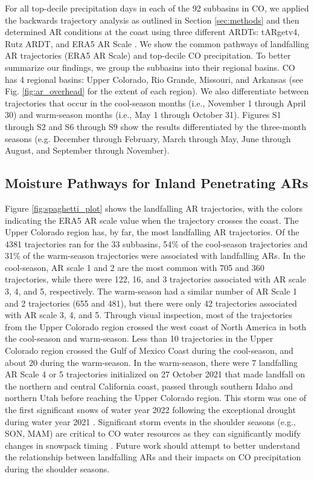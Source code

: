 \documentclass[draft]{agujournal2019}
\begin{document}
For all top-decile precipitation days in each of the 92 subbasins in CO, we applied the backwards trajectory analysis as outlined in Section \ref{sec:methods} and then determined AR conditions at the coast using three different ARDTs: tARgetv4, Rutz ARDT, and ERA5 AR Scale \cite{MartinRalph2019, Rutz2014, Guan2024AERA5}. We show the common pathways of landfalling AR trajectories (ERA5 AR Scale) and top-decile CO precipitation. To better summarize our findings, we group the subbasins into their regional basins. CO has 4 regional basins: Upper Colorado, Rio Grande, Missouri, and Arkansas (see Fig. \ref{fig:ar_overhead} for the extent of each region). We also differentiate between trajectories that occur in the cool-season months (i.e., November 1 through April 30) and warm-season months (i.e., May 1 through October 31). Figures S1 through S2 and S6 through S9 show the results differentiated by the three-month seasons (e.g. December through February, March through May, June through August, and September through November).

\subsection{Moisture Pathways for Inland Penetrating ARs}
\label{sec:results:moisture_pathways}

Figure \ref{fig:spaghetti_plot} shows the landfalling AR trajectories, with the colors indicating the ERA5 AR scale value when the trajectory crosses the coast. The Upper Colorado region has, by far, the most landfalling AR trajectories. Of the 4381 trajectories ran for the 33 subbasins, 54\% of the cool-season trajectories and 31\% of the warm-season trajectories were associated with landfalling ARs. In the cool-season, AR scale 1 and 2 are the most common with 705 and 360 trajectories, while there were 122, 16, and 3 trajectories associated with AR scale 3, 4, and 5, respectively. The warm-season had a similar number of AR Scale 1 and 2 trajectories (655 and 481), but there were only 42 trajectories associated with AR scale 3, 4, and 5. Through visual inspection, most of the trajectories from the Upper Colorado region crossed the west coast of North America in both the cool-season and warm-season. Less than 10 trajectories in the Upper Colorado region crossed the Gulf of Mexico Coast during the cool-season, and about 20 during the warm-season. In the warm-season, there were 7 landfalling AR Scale 4 or 5 trajectories initialized on 27 October 2021 that made landfall on the northern and central California coast, passed through southern Idaho and northern Utah before reaching the Upper Colorado region. This storm was one of the first significant snows of water year 2022 following the exceptional drought during water year 2021 \cite{Bolinger2023ClimateEdition}. Significant storm events in the shoulder seasons (e.g., SON, MAM) are critical to CO water resources as they can significantly modify changes in snowpack timing \cite{Heldmyer2023ABasin}. Future work should attempt to better understand the relationship between landfalling ARs and their impacts on CO precipitation during the shoulder seasons.
\end{document}

